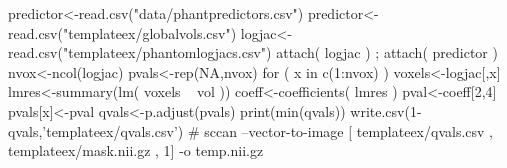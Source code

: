 
predictor<-read.csv("data/phantpredictors.csv")
predictor<-read.csv("templateex/globalvols.csv")
logjac<-read.csv("templateex/phantomlogjacs.csv")
attach( logjac ) ; attach( predictor )
nvox<-ncol(logjac)
pvals<-rep(NA,nvox)
for ( x in c(1:nvox) ) 
{ 
  voxels<-logjac[,x]
  lmres<-summary(lm( voxels ~  vol ))
  coeff<-coefficients( lmres )
  pval<-coeff[2,4]
  pvals[x]<-pval
}
qvals<-p.adjust(pvals)
print(min(qvals))
write.csv(1-qvals,'templateex/qvals.csv')
# sccan --vector-to-image [ templateex/qvals.csv , templateex/mask.nii.gz , 1] -o temp.nii.gz

